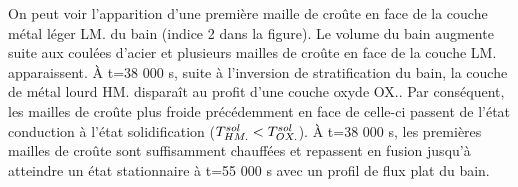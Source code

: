 On peut voir l'apparition d'une première maille de croûte en face de la couche métal léger LM. du bain (indice 2 dans la figure). Le volume du bain augmente suite aux coulées d'acier et plusieurs mailles de croûte en face de la couche LM. apparaissent. À t=38 000 s, suite à l'inversion de stratification du bain, la couche de métal lourd HM. disparaît au profit d'une couche oxyde OX.. Par conséquent, les mailles de croûte plus froide précédemment en face de celle-ci passent de l'état conduction à l'état solidification ($\temperature[sol]{HM.} < \temperature[sol]{OX.}$). À t=38 000 s, les premières mailles de croûte sont suffisamment chauffées et repassent en fusion jusqu'à atteindre un état stationnaire à t=55 000 s avec un profil de flux plat du bain.


